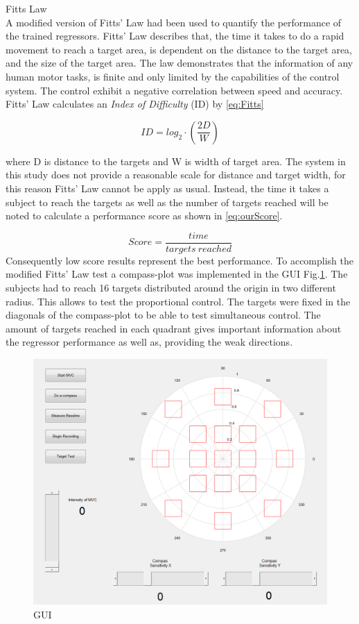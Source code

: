 \documentclass[a4paper, 10pt, conference]{ieeeconf}      %
\begin{document}
	Fitts Law\\
	A modified version of Fitts' Law had been used to quantify the performance of the trained regressors. Fitts' Law describes that, the time it takes to do a rapid movement to reach a target area, is dependent on the distance to the target area, and the size of the target area. The law demonstrates that the information of any human motor tasks, is finite and only limited by the capabilities of the control system. The control exhibit a negative correlation between speed and accuracy. \cite{Kamavuako2014}
	Fitts' Law calculates an \textit{Index of Difficulty} (ID) by \ref{eq:Fitts}
	
	\begin{equation} \label{eq:Fitts}
	ID = log_{2} \cdot (\frac{2D}{W})
	\end{equation}
	
	where D is distance to the targets and W is width of target area. The system in this study does not provide a reasonable scale for distance and target width, for this reason Fitts' Law cannot be apply as usual. Instead, the time it takes a subject to reach the targets as well as the number of targets reached will be noted to calculate a performance score as shown in \ref{eq:ourScore}.
	
	\begin{equation} \label{eq:ourScore}
	Score = \frac{time}{targets\ reached}
	\end{equation}
	Consequently low score results represent the best performance.
	To accomplish the modified Fitts' Law test a compass-plot was implemented in the GUI Fig.\ref{figurelabel}. The subjects had to reach 16 targets distributed around the origin in two different radius. This allows to test the proportional control. The targets were fixed in the diagonals of the compass-plot to be able to test simultaneous control. The amount of targets reached in each quadrant gives important information about the regressor performance as well as, providing the weak directions.
	\begin{figure}[thpb]
		\centering
		\includegraphics[scale=.2]{Figures/PlacesToGo}
		\caption{GUI}
		\label{figurelabel}
	\end{figure}
	
\end{document}
